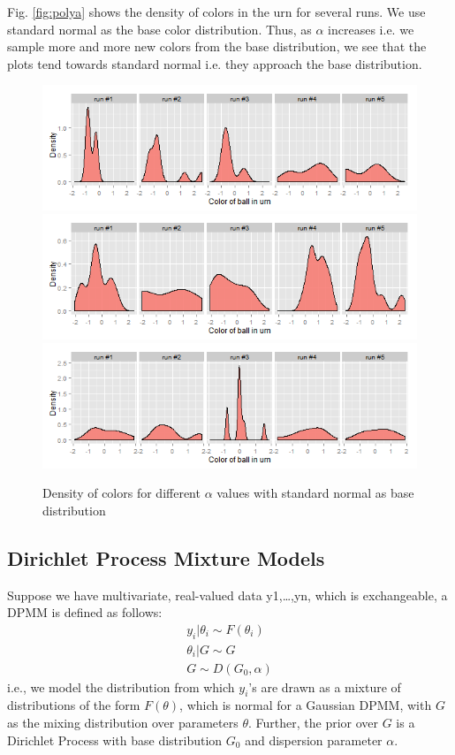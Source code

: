 \documentclass{article} %
\begin{document}
Fig. \ref{fig:polya} shows the density of colors in the urn for several runs. We use standard normal as the base color distribution. Thus, as $\alpha$ increases i.e. we sample more and more new colors from the base distribution, we see that the plots tend towards standard normal i.e. they approach the base distribution.
\begin{figure}
  \centering
  \caption{Density of colors for different $\alpha$ values with standard normal as base distribution}
\label{fig:polya}
  \includegraphics[width=.5\linewidth]{polya-urn-1.png}
  \label{fig:polya1}
  \includegraphics[width=.5\linewidth]{polya-urn-5.png}
  \label{fig:polya5}
  \includegraphics[width=.5\linewidth]{polya-urn-50.png}
  \label{fig:polya50}
\end{figure}

\subsection{Dirichlet Process Mixture Models}
Suppose we have multivariate, real-valued data y1,…,yn, which is exchangeable, a DPMM is defined as follows:
\begin{eqnarray*}
y_i|\theta_i \sim F(\theta_i)\\
\theta_i|G \sim G\\
G \sim D(G_0, \alpha)
\end{eqnarray*}
i.e., we model the distribution from which $y_i$'s are drawn as a mixture of distributions of the form $F(\theta)$, which is normal for a Gaussian DPMM, with $G$ as the mixing distribution over parameters $\theta$. Further, the prior over $G$ is a Dirichlet Process with base distribution $G_0$ and dispersion parameter $\alpha$.
\end{document}
